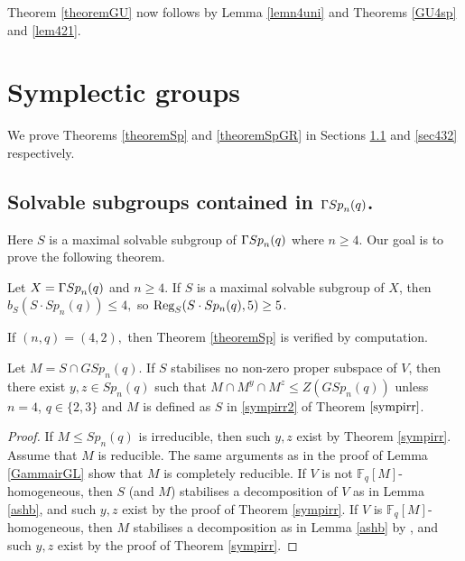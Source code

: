Theorem \ref{theoremGU} now follows by  Lemma \ref{lemn4uni} and Theorems \ref{GU4sp} and  \ref{lem421}.



\section{Symplectic groups}

We prove Theorems \ref{theoremSp} and \ref{theoremSpGR} in Sections \ref{sec431} and \ref{sec432} respectively.

\subsection{Solvable subgroups contained in ${{\Gamma Sp}}_n(q)$.} 
\label{sec431}
Here $S$ is a maximal solvable subgroup of ${{\Gamma Sp}}_n(q)$ where $n\ge 4.$
Our goal  is to prove the following theorem.

\begin{T3}
Let $X={{\Gamma Sp}}_n(q)$ and  $n \ge 4$. If $S$ is a maximal solvable subgroup of $X$, 
 then  $b_S(S \cdot Sp_n(q)) \le 4,$ so $\mathrm{Reg}_S(S \cdot Sp_n(q),5)\ge 5$.
\end{T3}


 If $(n,q)=(4,2),$ then   Theorem \ref{theoremSp} is verified by computation.  


\begin{Lem}
\label{3conjMSP}
Let $M= S \cap GSp_n(q).$ If $S$  stabilises no non-zero proper subspace of $V$, then there exist $y,z \in Sp_n(q)$ such that $M \cap M^y \cap M^z \le Z(GSp_n(q))$ unless $n=4$, $q \in \{2,3\}$ and $M$ is defined as $S$ in \eqref{sympirr2} of Theorem $\ref{sympirr}$. 
\end{Lem}
\begin{proof}
If $M \le Sp_n(q)$ is irreducible, then such $y,z$ exist by Theorem \ref{sympirr}. Assume that $M$ is reducible. The same arguments as in the proof of Lemma \ref{GammairGL} show that $M$ is completely reducible.  If $V$ is not $\mathbb{F}_q[M]$-homogeneous, then $S$ (and $M$) stabilises a decomposition of $V$ as in Lemma \ref{ashb}, and such $y,z$ exist by the proof of Theorem \ref{sympirr}. If $V$ is  $\mathbb{F}_q[M]$-homogeneous, then $M$ stabilises a decomposition as in    Lemma \ref{ashb} by \cite[(5.2) and (5.3)]{asch}, and such $y,z$ exist by the proof of Theorem \ref{sympirr}. 
\end{proof}

